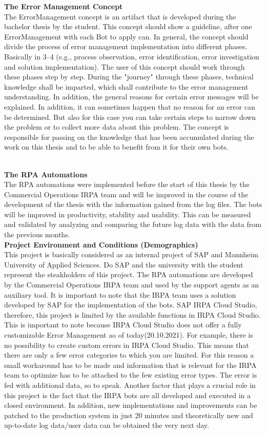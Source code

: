 \textbf{The Error Management Concept}\\
The ErrorManagement concept is an artifact that is developed during the bachelor thesis by the student.
This concept should show a guideline, after one ErrorManagement with each Bot to apply can.
In general, the concept should divide the process of error management implementation into different phases.
Basically in 3--4 (e.g., process observation, error identification, error investigation and solution implementation).
The user of this concept should work through these phases step by step.
During the "journey" through these phases, technical knowledge shall be imparted, which shall contribute to the error
management understanding.
In addition, the general reasons for certain error messages will be explained.
In addition, it can sometimes happen that no reason for an error can be determined.
But also for this case you can take certain steps to narrow down the problem or to collect more data about this problem.
The concept is responsible for passing on the knowledge that has been accumulated during the work on this thesis and
to be able to benefit from it for their own bots.


\\
\textbf{The RPA Automations}\\
The RPA automations were implemented before the start of this thesis by the Commercial Operations IRPA team and will be
improved in the course of the development of the thesis with the information gained from the log files.
 The bots will be improved in productivity, stability and usability.
 This can be measured and validated by analyzing and comparing the future log data with the data from the previous months.\\
\newpage
\textbf{Project Environment and Conditions (Demographics)}\\
This project is basically considered as an internal project of SAP and Mannheim University of Applied Sciences.
Do SAP and the university with the student represent the steakholders of this project.
The RPA automations are developed by the Commercial Operations IRPA team and used by the support agents as an auxiliary tool.
It is important to note that the IRPA team uses a solution developed by SAP for the implementation of the bots.
SAP IRPA Cloud Studio, therefore, this project is limited by the available functions in IRPA Cloud Studio.
This is important to note because IRPA Cloud Studio does not offer a fully customizable Error Management ao of today(20.10.2021).
For example, there is no possibility to create custom errors in IRPA Cloud Studio.
This means that there are only a few error categories to which you are limited.
For this reason a small workaround has to be made and information that is relevant for the IRPA team to optimize has
to be attached to the few existing error types.
The error is fed with additional data, so to speak.
Another factor that plays a crucial role in this project is the fact that the IRPA bots are all developed and executed
in a closed environment.
In addition, new implementations and improvements can be patched to the production system in just 20 minutes and
theoretically new and up-to-date log data/user data can be obtained the very next day.

